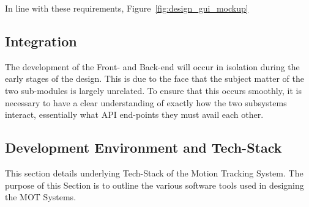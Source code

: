 In line with these requirements, Figure~\ref{fig:design_gui_mockup} 


\subsection{Integration}
The development of the Front- and Back-end will occur in isolation during the
early stages of the design. This is due to the face that the subject matter of
the two sub-modules is largely unrelated.  To ensure that this occurs smoothly,
it is necessary to have a clear understanding of exactly how the two subsystems
interact, essentially what API end-points they must avail each other.

\subsection{Development Environment and Tech-Stack}
This section details underlying Tech-Stack of the Motion Tracking System. The
purpose of this Section is to outline the various software tools used in
designing the MOT Systems.




